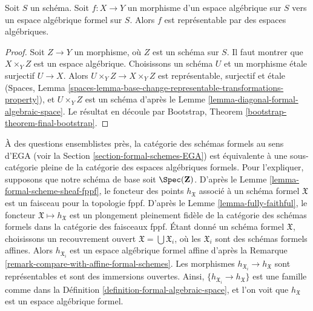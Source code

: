 \begin{lemma}
\label{lemma-space-to-formal-space}
Soit $S$ un schéma. Soit $f : X \to Y$ un morphisme d'un
espace algébrique sur $S$ vers un espace algébrique formel sur $S$.
Alors $f$ est représentable par des espaces algébriques.
\end{lemma}

\begin{proof}
Soit $Z \to Y$ un morphisme, où $Z$ est un schéma sur $S$.
Il faut montrer que $X \times_Y Z$ est un espace algébrique.
Choisissons un schéma $U$ et un morphisme étale surjectif $U \to X$.
Alors $U \times_Y Z \to X \times_Y Z$ est représentable, surjectif et étale
(Spaces, Lemma
\ref{spaces-lemma-base-change-representable-transformations-property}),
et $U \times_Y Z$ est un schéma d'après le
Lemme \ref{lemma-diagonal-formal-algebraic-space}.
Le résultat en découle par
Bootstrap, Theorem \ref{bootstrap-theorem-final-bootstrap}.
\end{proof}

\begin{remark}
\label{remark-compare-with-formal-schemes}
À des questions ensemblistes près, la catégorie des schémas formels au sens d'EGA
(voir la Section \ref{section-formal-schemes-EGA}) est équivalente à une sous-catégorie
pleine de la catégorie des espaces algébriques formels. Pour l'expliquer,
supposons que notre schéma de base soit $\Spec(\mathbf{Z})$. D'après le
Lemme \ref{lemma-formal-scheme-sheaf-fppf}, le foncteur des points
$h_\mathfrak X$ associé à un schéma formel $\mathfrak X$ est un faisceau
pour la topologie fppf. D'après le Lemme \ref{lemma-fully-faithful},
le foncteur $\mathfrak X \mapsto h_\mathfrak X$ est un plongement pleinement fidèle
de la catégorie des schémas formels dans la catégorie des
faisceaux fppf. Étant donné un schéma formel $\mathfrak X$, choisissons un recouvrement ouvert
$\mathfrak X = \bigcup \mathfrak X_i$, où les $\mathfrak X_i$ sont des
schémas formels affines. Alors $h_{\mathfrak X_i}$
est un espace algébrique formel affine d'après la
Remarque \ref{remark-compare-with-affine-formal-schemes}.
Les morphismes $h_{\mathfrak X_i} \to h_\mathfrak X$ sont représentables
et sont des immersions ouvertes. Ainsi, $\{h_{\mathfrak X_i} \to h_\mathfrak X\}$
est une famille comme dans la Définition \ref{definition-formal-algebraic-space},
et l'on voit que $h_\mathfrak X$ est un espace algébrique formel.
\end{remark}

